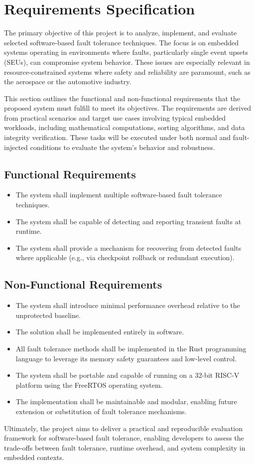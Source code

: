 \clearpage
\section{Requirements Specification}

The primary objective of this project is to analyze, implement, and evaluate selected software-based fault tolerance techniques. The focus is on embedded systems operating in environments where faults, particularly single event upsets (SEUs), can compromise system behavior. These issues are especially relevant in resource-constrained systems where safety and reliability are paramount, such as the aerospace or the automotive industry.

This section outlines the functional and non-functional requirements that the proposed system must fulfill to meet its objectives. The requirements are derived from practical scenarios and target use cases involving typical embedded workloads, including mathematical computations, sorting algorithms, and data integrity verification. These tasks will be executed under both normal and fault-injected conditions to evaluate the system's behavior and robustness.

\subsection*{Functional Requirements}
\begin{itemize}
\item The system shall implement multiple software-based fault tolerance techniques.
\item The system shall be capable of detecting and reporting transient faults at runtime.
\item The system shall provide a mechanism for recovering from detected faults where applicable (e.g., via checkpoint rollback or redundant execution).
\end{itemize}

\subsection*{Non-Functional Requirements}
\begin{itemize}
\item The system shall introduce minimal performance overhead relative to the unprotected baseline.
\item The solution shall be implemented entirely in software.
\item All fault tolerance methods shall be implemented in the Rust programming language to leverage its memory safety guarantees and low-level control.
\item The system shall be portable and capable of running on a 32-bit RISC-V platform using the FreeRTOS operating system.
\item The implementation shall be maintainable and modular, enabling future extension or substitution of fault tolerance mechanisms.
\end{itemize}

Ultimately, the project aims to deliver a practical and reproducible evaluation framework for software-based fault tolerance, enabling developers to assess the trade-offs between fault tolerance, runtime overhead, and system complexity in embedded contexts.